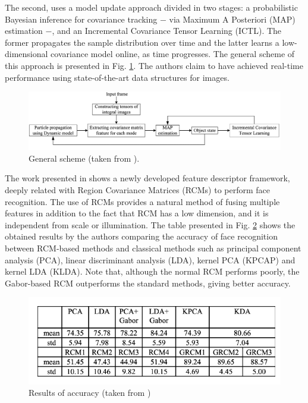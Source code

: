 \documentclass[11pt]{article}
\theoremstyle{definition}
\theoremstyle{remark}
\theoremstyle{remark}
\theoremstyle{remark}
\begin{document}
The second, uses a model update approach divided in two stages: a probabilistic
Bayesian inference for covariance tracking $-$ via Maximum A Posteriori (MAP)
estimation $-$, and an Incremental Covariance Tensor Learning (ICTL). The former
propagates the sample distribution over time and the latter learns a
low-dimensional covariance model online, as time progresses. The general scheme
of this approach is presented in Fig. \ref{fig:scheme}. The authors claim to
have achieved real-time performance using state-of-the-art data structures for
images.

\begin{figure}[H]
  \centering \includegraphics[scale=0.21]{scheme.png}
  \caption{General scheme (taken from \parencite{wu2012real}).}
  \label{fig:scheme}
\end{figure}


The work presented in \cite{pang2008gabor} shows a newly developed feature
descriptor framework, deeply related with Region Covariance Matrices (RCMs) to
perform face recognition. The use of RCMs provides a natural method of fusing
multiple features in addition to the fact that RCM has a low dimension, and it
is independent from scale or illumination. The table presented in Fig.
\ref{fig:accuracy} shows the obtained results by the authors comparing the
accuracy of face recognition between RCM-based methods and classical methods
such as principal component analysis (PCA), linear discriminant analysis (LDA),
kernel PCA (KPCAP) and kernel LDA (KLDA). Note that, although the normal RCM
performs poorly, the Gabor-based RCM outperforms the standard methods, giving
better accuracy.

\begin{figure}[H]
  \centering \includegraphics[scale = 0.45]{accuracy_comparing.png}
  \caption{Results of accuracy (taken from \cite{pang2008gabor})}
  \label{fig:accuracy}
\end{figure}
\end{document}
